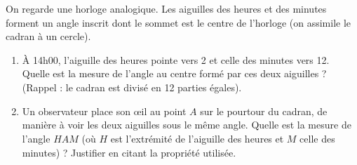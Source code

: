 \documentclass[11pt]{article}
\begin{document}
\begin{exercice}
On regarde une horloge analogique. Les aiguilles des heures et des minutes forment un angle inscrit dont le sommet est le centre de l'horloge (on assimile le cadran à un cercle).
\begin{enumerate}
    \item À 14h00, l'aiguille des heures pointe vers 2 et celle des minutes vers 12. Quelle est la mesure de l'angle au centre formé par ces deux aiguilles ? (Rappel : le cadran est divisé en 12 parties égales).
    \item Un observateur place son œil au point $A$ sur le pourtour du cadran, de manière à voir les deux aiguilles sous le même angle. Quelle est la mesure de l'angle $\widehat{HAM}$ (où $H$ est l'extrémité de l'aiguille des heures et $M$ celle des minutes) ? Justifier en citant la propriété utilisée.
\end{enumerate}
\end{exercice}
\end{document}

